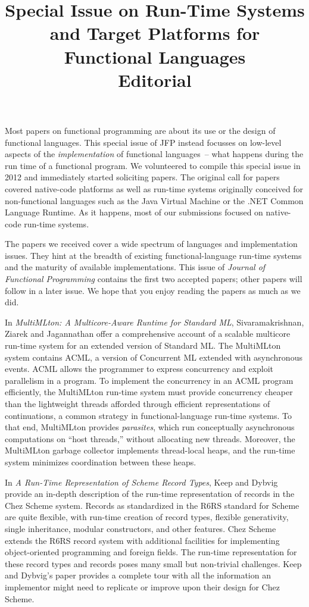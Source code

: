 \documentclass{jfp1}
\title[Special Issue on Run-Time Systems and Target Platforms for Functional Languages]
      {Special Issue on Run-Time Systems and Target Platforms for Functional Languages \\
Editorial}
\begin{document}
\maketitle

\noindent Most papers on functional programming are about its use or the design
of functional languages.  This special issue of JFP instead focusses
on low-level aspects of the \emph{implementation} of functional
languages~-- what happens during the run time of a functional program.
We volunteered to compile this special issue in 2012 and immediately
started soliciting papers.  The
original call for papers covered native-code platforms as well as
run-time systems originally conceived for non-functional languages
such as the Java Virtual Machine or the .NET Common Language Runtime.
As it happens, most of our submissions focused on 
native-code run-time systems.  

The papers we received
cover a wide spectrum of languages and implementation issues.  They
hint at the breadth of existing functional-language run-time systems
and the maturity of available implementations.  This issue of
\textit{Journal of Functional Programming} contains the first two
accepted papers; other papers will follow in a later issue.
We hope that you enjoy
reading the papers as much as we did.

In \textit{MultiMLton: A Multicore-Aware Runtime for Standard ML},
Sivaramakrishnan, Ziarek and Jagannathan offer a comprehensive account
of a scalable multicore run-time system for an extended version of
Standard ML.  The MultiMLton system contains ACML, a version of
Concurrent ML extended with asynchronous events.  ACML allows the
programmer to express concurrency and exploit parallelism in a
program.  To implement the concurrency in an ACML program 
efficiently, the MultiMLton run-time system must provide
concurrency cheaper than the lightweight threads afforded through
efficient representations of continuations, a common strategy in
functional-language run-time systems.  To that end, MultiMLton provides
\textit{parasites}, which run conceptually asynchronous computations
on ``host threads,'' without allocating new threads.  Moreover, the
MultiMLton garbage collector implements thread-local heaps, and the
run-time system minimizes coordination between these heaps.

In \textit{A Run-Time Representation of Scheme Record Types}, Keep and
Dybvig provide an in-depth description of the run-time representation
of records in the Chez Scheme system.  Records as standardized in the
R6RS standard for Scheme are quite flexible, with run-time creation of
record types, flexible generativity, single inheritance, modular
constructors, and other features. Chez Scheme extends the R6RS record
system with additional facilities for implementing object-oriented programming
and foreign fields.  The run-time representation for these record types and
records poses many small but non-trivial challenges. Keep and Dybvig's paper
provides a complete tour with all the information an implementor might
need to replicate or improve upon their design for Chez Scheme.
\end{document}
